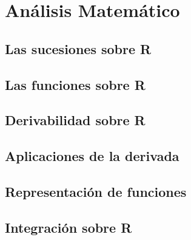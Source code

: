 \part{Análisis Matemático}
\chapter{Las sucesiones sobre R}
\chapter{Las funciones sobre R}
\chapter{Derivabilidad sobre R}
\chapter{Aplicaciones de la derivada}
\chapter{Representación de funciones}
\chapter{Integración sobre R}
